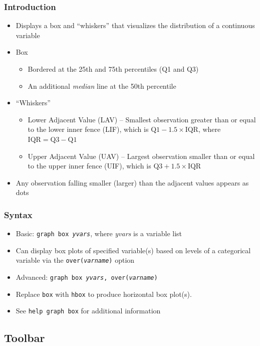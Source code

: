 \documentclass{beamer}
\begin{document}
\begin{frame}
	\frametitle{Introduction}
		\begin{itemize}
			\item Displays a box and ``whiskers'' that visualizes the distribution of a continuous variable
			\item Box
				\begin{itemize}
					\item Bordered at the 25th and 75th percentiles (Q1 and Q3)
					\item An additional \textit{median} line at the 50th percentile
				\end{itemize}
			\item ``Whiskers''
				\begin{itemize}
					\item Lower Adjacent Value (LAV) -- Smallest observation greater than or equal to the lower inner fence (LIF), which is $\mbox{Q1}-1.5\times \mbox{IQR}$, where $\mbox{IQR}=\mbox{Q3}-\mbox{Q1}$
					\item Upper Adjacent Value (UAV) -- Largest observation smaller than or equal to the upper inner fence (UIF), which is $\mbox{Q3}+1.5\times \mbox{IQR}$
				\end{itemize}
			\item Any observation falling smaller (larger) than the adjacent values appears as dots
		\end{itemize}
\end{frame}

\begin{frame}
	\frametitle{Syntax}
		\begin{itemize}
			\item Basic: \texttt{graph box \textit{yvars}}, where \textit{yvars} is a variable list
			\item Can display box plots of specified variable(s) based on levels of a categorical variable via the \texttt{over(\textit{varname})} option
			\item Advanced: \texttt{graph box \textit{yvars}, over(\textit{varname})}
			\item Replace \texttt{box} with \texttt{hbox} to produce horizontal box plot(s).
			\item See \texttt{help graph box} for additional information
		\end{itemize}
\end{frame}

\subsection{Toolbar}
\end{document}
